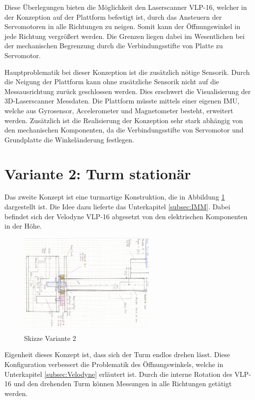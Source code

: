  Diese Überlegungen bieten die Möglichkeit den Laserscanner VLP-16, welcher in der Konzeption auf der Plattform befestigt ist, durch das Ansteuern der Servomotoren in alle Richtungen zu neigen. Somit kann der Öffnungswinkel in jede Richtung vergrößert werden. Die Grenzen liegen dabei im Wesentlichen bei der mechanischen Begrenzung durch die Verbindungsstifte von Platte zu Servomotor.
 
 Hauptproblematik bei dieser Konzeption ist die zusätzlich nötige Sensorik. Durch die Neigung der Plattform kann ohne zusätzliche Sensorik nicht auf die Messausrichtung zurück geschlossen werden. Dies erschwert die Visualisierung der 3D-Laserscanner Messdaten. Die Plattform müsste mittels einer eigenen \ac{IMU}, welche aus Gyrosensor, Accelerometer und Magnetometer besteht, erweitert werden. Zusätzlich ist die Realisierung der Konzeption sehr stark abhängig von den mechanischen Komponenten, da die Verbindungsstifte von Servomotor und Grundplatte die Winkeländerung festlegen.
 

\section {Variante 2: Turm stationär}
\label{sec:var2}
Das zweite Konzept ist eine turmartige Konstruktion, die in Abbildung \ref{fig:skizze_unrotierend} dargestellt ist. Die Idee dazu lieferte das Unterkapitel \ref{subsec:IMM}. Dabei befindet sich der Velodyne VLP-16 abgesetzt von den elektrischen Komponenten in der Höhe.

\begin{figure}[H]
	\centering
	\includegraphics[angle=90,width=0.6\textwidth]{resources/skizze_unrotierend.PNG}
	\caption[Skizze Varainte 2]{Skizze Variante 2 }
	\label{fig:skizze_unrotierend}
\end{figure} 

Eigenheit dieses Konzept ist, dass sich der Turm endlos drehen lässt. Diese Konfiguration verbessert die Problematik des Öffnungswinkels, welche in Unterkapitel \ref{subsec:Velodyne} erläutert ist. Durch die interne Rotation des VLP-16 und den drehenden Turm können Messungen in alle Richtungen getätigt werden. 


